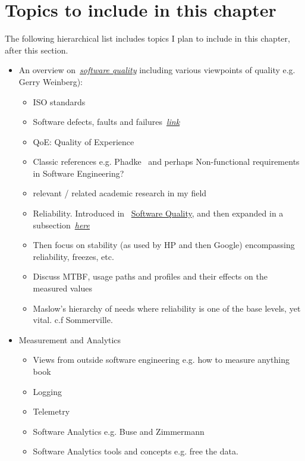 
\section{Topics to include in this chapter}
The following hierarchical list includes topics I plan to include in this chapter, after this section.


\begin{itemize}
    \item An overview on~\href{software.quality}{\emph{software quality}} including various viewpoints of quality e.g. Gerry Weinberg):
    \begin{itemize} 
        \item ISO standards
        \item Software defects, faults and failures~\hyperlink{defects.faults.failures}{\emph{link}}
        \item QoE: Quality of Experience
        \item Classic references e.g. Phadke~\citep{phadke1995_quality_engineering_using_robust_design} and perhaps Non-functional requirements in Software Engineering? 
        \item relevant / related academic research in my field
        \item Reliability. Introduced in ~\hyperlink{software.quality}{Software Quality}, and then expanded in a subsection~\hyperlink{software.reliability}{\emph{here}}
        \item Then focus on stability (as used by HP and then Google) encompassing reliability, freezes, etc.
        \item Discuss MTBF, usage paths and profiles and their effects on the measured values
        \item Maslow's hierarchy of needs where reliability is one of the base levels, yet vital. c.f Sommerville.
    \end{itemize}
    \item Measurement and Analytics
    \begin{itemize}
        \item Views from outside software engineering e.g. how to measure anything book
        \item Logging
        \item Telemetry
        \item Software Analytics e.g. Buse and Zimmermann
        \item Software Analytics tools and concepts e.g. free the data.

\end{itemize}
\end{itemize}
